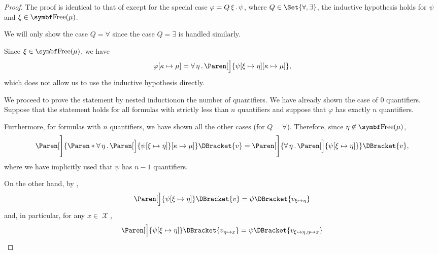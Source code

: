 \begin{proof}
   The proof is identical to that of  except for the special case \( \varphi = Q \, \xi \, . \, \psi \), where \( Q \in \Set{ \forall, \exists } \), the inductive hypothesis holds for \( \psi \) and \( \xi \in \Bold{Free}(\mu) \).

  We will only show the case \( Q = \forall \) since the case \( Q = \exists \) is handled similarly.

  Since \( \xi \in \Bold{Free}(\mu) \), we have
  \begin{equation*}
    \varphi[\kappa \mapsto \mu]
    =
    \Qnt{\forall}{\eta} \Paren[\Big]{ \psi[\xi \mapsto \eta][\kappa \mapsto \mu] },
  \end{equation*}
  which does not allow us to use the inductive hypothesis directly.

  We proceed to prove the statement by nested induction\IND on the number of quantifiers. We have already shown the case of \( 0 \) quantifiers. Suppose that the statement holds for all formulas with strictly less than \( n \) quantifiers and suppose that \( \varphi \) has exactly \( n \) quantifiers.

  Furthermore, for formulas with \( n \) quantifiers, we have shown all the other cases (for \( Q = \forall \)). Therefore, since \( \eta \not\in \Bold{Free}(\mu) \),
  \begin{equation}\label{eq:thm:first_order_substitution_equivalence/term_in_formula/nested_induction}
    \Paren[\Bigg]{ \Paren*{ \Qnt{\forall}{\eta} \Paren[\Big]{ \psi[\xi \mapsto \eta] } }[\kappa \mapsto \mu] }\DBracket{v}
    =
    \Paren[\Bigg]{\Qnt{\forall}{\eta} \Paren[\Big]{ \psi[\xi \mapsto \eta] } }\DBracket{v},
  \end{equation}
  where we have implicitly used that \( \psi \) has \( n - 1 \) quantifiers.

  On the other hand, by ,
  \begin{equation*}
    \Paren[\Big]{ \psi[\xi \mapsto \eta] }\DBracket{v} = \psi\DBracket{v_{\xi \mapsto \eta}}
  \end{equation*}
  and, in particular, for any \( x \in \mscrX \),
  \begin{equation*}
    \Paren[\Big]{ \psi[\xi \mapsto \eta] }\DBracket{v_{\eta \mapsto x}} = \psi\DBracket{v_{\xi \mapsto \eta,\eta \mapsto x}}
  \end{equation*}


\end{proof}
